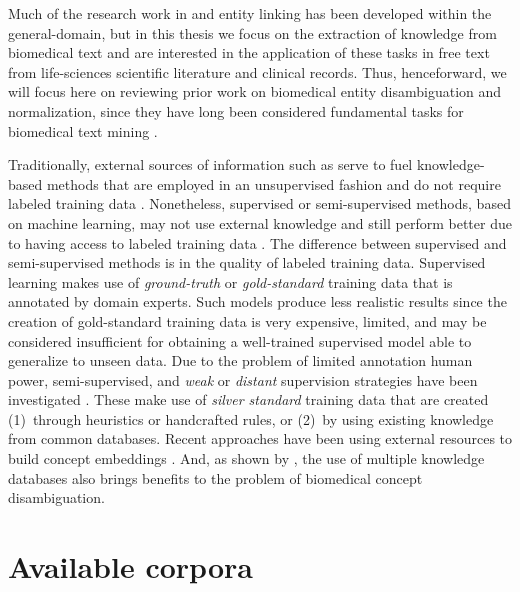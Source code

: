 Much of the research work in  and entity linking has been developed within the general-domain, but in this thesis we focus on the extraction of knowledge from biomedical text and are interested in the application of these tasks in free text from life-sciences scientific literature and clinical records.
Thus, henceforward, we will focus here on reviewing prior work on biomedical entity disambiguation and normalization, since they have long been considered fundamental tasks for biomedical text mining \parencite{schuemie2005a,krauthammer2004a}.

Traditionally, external sources of information such as  serve to fuel  knowledge-based methods that are employed in an unsupervised fashion and do not require labeled training data \parencite{jimenoyepes2010a,mcinnes2011a,elrab2013a,garla2013a,mcinnes2013a,duque2018a}.
Nonetheless, supervised or semi-supervised methods, based on machine learning, may not use external knowledge and still perform better due to having access to labeled training data \parencite{mcinnes2014a,jimenoyepes2017a}.
The difference between supervised and semi-supervised methods is in the quality of labeled training data.
Supervised learning makes use of \textit{ground-truth} or \textit{gold-standard} training data that is annotated by domain experts.
Such models produce less realistic results since the creation of gold-standard training data is very expensive, limited, and may be considered insufficient for obtaining a well-trained supervised model able to generalize to unseen data.
Due to the problem of limited annotation human power, semi-supervised, and \textit{weak} or \textit{distant} supervision strategies have been investigated \parencite{li2019f}.
These make use of \textit{silver standard} training data that are created (1)~through heuristics or handcrafted rules, or (2)~by using existing knowledge from common databases.
Recent approaches have been using external resources to build concept embeddings \parencite{sabbir2016a,newmangriffis2018a}.
And, as shown by \textcite{tsai2016a,siu2016a}, the use of multiple knowledge databases also brings benefits to the problem of biomedical concept disambiguation.


\section{Available corpora}





